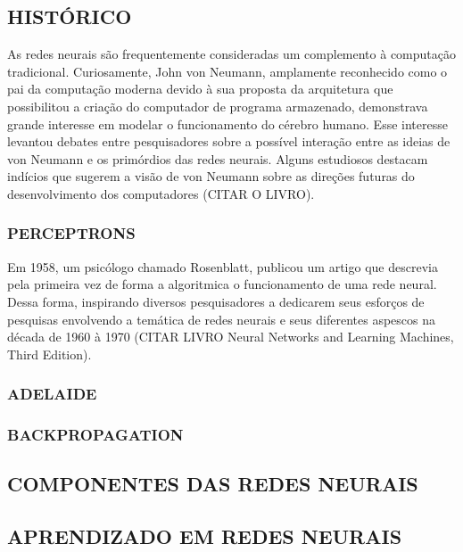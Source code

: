     \subsection{HISTÓRICO}
        As redes neurais são frequentemente consideradas um complemento à computação tradicional. Curiosamente, 
        John von Neumann, amplamente reconhecido como o pai da computação moderna devido à sua proposta da arquitetura 
        que possibilitou a criação do computador de programa armazenado, demonstrava grande interesse em modelar o 
        funcionamento do cérebro humano. Esse interesse levantou debates entre pesquisadores sobre a possível interação 
        entre as ideias de von Neumann e os primórdios das redes neurais. Alguns estudiosos destacam indícios que 
        sugerem a visão de von Neumann sobre as direções futuras do desenvolvimento dos computadores (CITAR O LIVRO).

        \subsubsection{PERCEPTRONS}
            Em 1958, um psicólogo chamado Rosenblatt, publicou um artigo que descrevia pela primeira vez de forma a
            algoritmica o funcionamento de uma rede neural. Dessa forma, inspirando diversos pesquisadores a dedicarem
            seus esforços de pesquisas envolvendo a temática de redes neurais e seus diferentes aspescos na década de 
            1960 à 1970 (CITAR LIVRO Neural Networks and Learning Machines, Third Edition). 
            

        \subsubsection{ADELAIDE}

        \subsubsection{BACKPROPAGATION}
      
        
    \subsection{COMPONENTES DAS REDES NEURAIS}

    \subsection{APRENDIZADO EM REDES NEURAIS}
